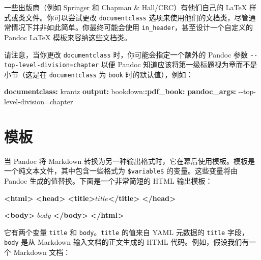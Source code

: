 \documentclass[
  12pt,
]{krantz}
\newenvironment{Shaded}{\begin{snugshade}}{\end{snugshade}}
\newcommand{\AttributeTok}[1]{\textcolor[rgb]{0.13,0.29,0.53}{#1}}
\newcommand{\FunctionTok}[1]{\textcolor[rgb]{0.13,0.29,0.53}{\textbf{#1}}}
\newcommand{\KeywordTok}[1]{\textcolor[rgb]{0.13,0.29,0.53}{\textbf{#1}}}
\newcommand{\NormalTok}[1]{#1}
\theoremstyle{definition}
\theoremstyle{definition}
\theoremstyle{definition}
\theoremstyle{definition}
\theoremstyle{remark}
\begin{document}
一些出版商（例如 Springer 和 Chapman \& Hall/CRC）有他们自己的 LaTeX 样式或类文件。你可以尝试更改 \texttt{documentclass} 选项来使用他们的文档类，尽管通常情况下并非如此简单。你最终可能会使用 \texttt{in\_header}，甚至设计一个自定义的 Pandoc LaTeX 模板来容纳这些文档类。

请注意，当你更改 \texttt{documentclass} 时，你可能会指定一个额外的 Pandoc 参数 \texttt{-\/-top-level-division=chapter} 以便 Pandoc 知道应该将第一级标题视为章而不是小节（这是在 \texttt{documentclass} 为 \texttt{book} 时的默认值），例如：

\begin{Shaded}
\begin{Highlighting}[]
\FunctionTok{documentclass}\KeywordTok{:}\AttributeTok{ krantz}
\FunctionTok{output}\KeywordTok{:}
\AttributeTok{  bookdown:}\FunctionTok{:pdf\_book}\KeywordTok{:}
\AttributeTok{    }\FunctionTok{pandoc\_args}\KeywordTok{:}\AttributeTok{ {-}{-}top{-}level{-}division=chapter}
\end{Highlighting}
\end{Shaded}

\hypertarget{ux6a21ux677f}{%
\section{模板}\label{ux6a21ux677f}}

当 Pandoc 将 Markdown 转换为另一种输出格式时，它在幕后使用模板。模板是一个纯文本文件，其中包含一些格式为 \texttt{\$variable\$} 的变量。这些变量将由 Pandoc 生成的值替换。下面是一个非常简短的 HTML 输出模板：

\begin{Shaded}
\begin{Highlighting}[]
\KeywordTok{\textless{}html\textgreater{}}
  \KeywordTok{\textless{}head\textgreater{}}
    \KeywordTok{\textless{}title\textgreater{}}\NormalTok{$title$}\KeywordTok{\textless{}/title\textgreater{}}
  \KeywordTok{\textless{}/head\textgreater{}}
  
  \KeywordTok{\textless{}body\textgreater{}}
\NormalTok{  $body$}
  \KeywordTok{\textless{}/body\textgreater{}}
\KeywordTok{\textless{}/html\textgreater{}}
\end{Highlighting}
\end{Shaded}

它有两个变量 \texttt{title} 和 \texttt{body}。\texttt{title} 的值来自 YAML 元数据的 \texttt{title} 字段，\texttt{body} 是从 Markdown 输入文档的正文生成的 HTML 代码。例如，假设我们有一个 Markdown 文档：
\end{document}
